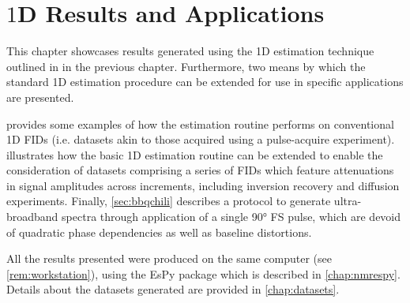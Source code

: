 \chapter{$1$D Results and Applications}
\label{chap:results}

This chapter showcases results generated using the \ac{1D} estimation
technique outlined in in the previous chapter. Furthermore, two means by
which the standard \ac{1D} estimation procedure can be extended for use in
specific applications are presented.

 provides some examples of how the estimation
routine performs on conventional \ac{1D} \acp{FID} (i.e. datasets akin to those
acquired using a pulse-acquire experiment).  illustrates
how the basic \ac{1D} estimation routine can be extended to enable the
consideration of datasets comprising a series of \acp{FID} which
feature attenuations in signal amplitudes across increments, including inversion
recovery and diffusion experiments. Finally, \cref{sec:bbqchili}
describes a protocol to generate ultra-broadband spectra through application of
a single \ang{90} \acl{FS} pulse, which are devoid of quadratic phase
dependencies as well as baseline distortions.

All the results presented were produced on the same computer (see
\cref{rem:workstation}), using the \ac{EsPy} package which is
described in \cref{chap:nmrespy}. Details about the datasets generated are
provided in \cref{chap:datasets}.





